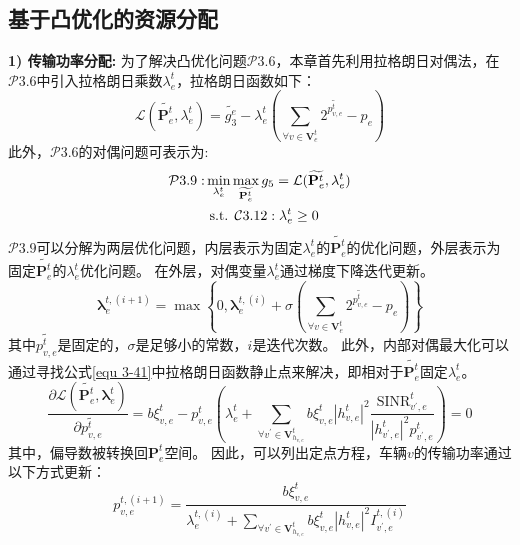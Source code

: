 \subsection{基于凸优化的资源分配}
\textbf{1) 传输功率分配:} 为了解决凸优化问题$\mathcal{P}3.6$，本章首先利用拉格朗日对偶法\cite{boyd2004convex}，在$\mathcal{P}3.6$中引入拉格朗日乘数$\lambda_{e}^{t}$，拉格朗日函数如下：
\begin{equation}
	\mathcal{L}(\widetilde{\mathbf{{P}}_{e}^{t}}, {\lambda}_{e}^{t} ) = \widetilde{g_3^{e}} -  {\lambda}_{e}^{t} (\sum_{\forall v \in \mathbf{V}_{e}^{t}} 2^{\widetilde{p_{v, e}^{t}}} - p_{e} )
	\label{equ 3-41}
\end{equation}
此外，$\mathcal{P}3.6$的对偶问题可表示为:
\begin{align}
	\mathcal{P}3.9: & \min_{{\lambda}_{e}^{t}} \max_{\widetilde{\mathbf{{P}}_{e}^{t}}}  g_5 = \mathcal{L}(\widetilde{\mathbf{{P}}_{e}^{t}}, {\lambda}_{e}^{t} ) \notag \\
	&\text { s.t. } \mathcal{C}3.12: \mathbf{\lambda}_{e}^{t} \geq 0  
\end{align}
$\mathcal{P}3.9$可以分解为两层优化问题，内层表示为固定${\lambda}_{e}^{t}$的$\widetilde{\mathbf{{P}}_{e}^{t}}$的优化问题，外层表示为固定$\widetilde{\mathbf{{P}}_{e}^{t}}$的${\lambda}_{e}^{t}$优化问题。
在外层，对偶变量${\lambda}_{e}^{t}$通过梯度下降迭代更新。
\begin{equation}
	\mathbf{\lambda}_{e}^{t, (i+1)} = \max\left\{0, \mathbf{\lambda}_{e}^{t, (i)} + \sigma (\sum_{\forall v \in \mathbf{V}_{e}^{t}} 2^{\widetilde{p_{v, e}^{t}}} - p_{e} )\right\}
\end{equation}
其中$\widetilde{p_{v, e}^{t}}$是固定的，$\sigma$是足够小的常数，$i$是迭代次数。
此外，内部对偶最大化可以通过寻找公式\ref{equ 3-41}中拉格朗日函数静止点来解决，即相对于$\widetilde{\mathbf{{P}}_{e}^{t}}$固定${\lambda}_{e}^{t}$。
\begin{equation}
\frac{\partial \mathcal{L}\left(\widetilde{\mathbf{{P}}_{e}^{t}}, \mathbf{\lambda}_{e}^{t} \right)}{\partial \widetilde{p_{v, e}^{t}}}= b  \xi_{v, e}^{t}  - p_{v, e}^{t}(\lambda_{e}^{t} +\sum\limits_{\forall v^{\prime} \in \mathbf{V}_{h_{v, e}}^{t}} b  \xi_{v, e}^{t} |h_{v, e}^t|^2 \frac{\mathrm{SINR}_{v^{\prime}, e}^t}{|h_{v^{\prime}, e}^t| ^{2} p_{v^{\prime}, e}^{t}}) =0
\end{equation}
其中，偏导数被转换回$\mathbf{P}_{e}^{t}$空间。
因此，可以列出定点方程，车辆$v$的传输功率通过以下方式更新：
\begin{equation}
p_{v, e}^{t, {(i+1)}}=\frac{b \xi_{v, e}^{t}}{\lambda_{e}^{t,(i)}+\sum\limits_{\forall v^{\prime} \in \mathbf{V}_{h_{v, e}}^{t}} b  \xi_{v, e}^{t}|h_{v, e}^t|^2 {I}_{v^{\prime}, e}^{t, (i)} }
\end{equation}
